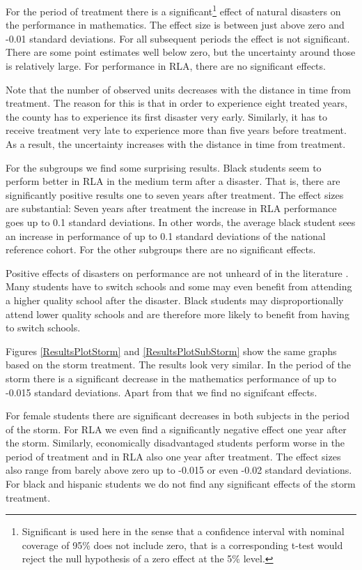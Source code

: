 For the period of treatment there is a significant\footnote{Significant is used here in the sense that a confidence interval with nominal coverage of 95\% does not include zero, that is a corresponding t-test would reject the null hypothesis of a zero effect at the 5\% level.} effect of natural disasters on the performance in mathematics. The effect size is between just above zero and -0.01 standard deviations. For all subsequent periods the effect is not significant. There are some point estimates well below zero, but the uncertainty around those is relatively large. For performance in RLA, there are no significant effects.

Note that the number of observed units decreases with the distance in time from treatment. The reason for this is that in order to experience eight treated years, the county has to experience its first disaster very early. Similarly, it has to receive treatment very late to experience more than five years before treatment. As a result, the uncertainty increases with the distance in time from treatment.

For the subgroups we find some surprising results. Black students seem to perform better in RLA in the medium term after a disaster. That is, there are significantly positive results one to seven years after treatment. The effect sizes are substantial: Seven years after treatment the increase in RLA performance goes up to 0.1 standard deviations. In other words, the average black student sees an increase in performance of up to 0.1 standard deviations of the national reference cohort. For the other subgroups there are no significant effects.

Positive effects of disasters on performance are not unheard of in the literature \citep[see e.g.][]{Sacerdote_2012}. Many students have to switch schools and some may even benefit from attending a higher quality school after the disaster. Black students may disproportionally attend lower quality schools and are therefore more likely to benefit from having to switch schools. 

Figures \ref{ResultsPlotStorm} and \ref{ResultsPlotSubStorm} show the same graphs based on the storm treatment. The results look very similar. In the period of the storm there is a significant decrease in the mathematics performance of up to -0.015 standard deviations. Apart from that we find no signifcant effects.

For female students there are significant decreases in both subjects in the period of the storm. For RLA we even find a significantly negative effect one year after the storm. Similarly, economically disadvantaged students perform worse in the period of treatment and in RLA also one year after treatment. The effect sizes also range from barely above zero up to -0.015 or even -0.02 standard deviations. For black and hispanic students we do not find any significant effects of the storm treatment.


